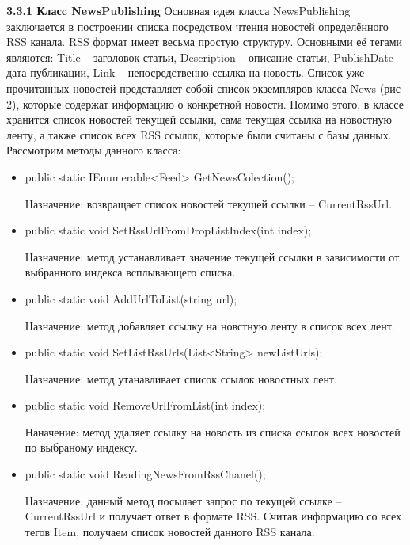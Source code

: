 \documentclass[14pt,a4paper]{extreport}
\begin{document}
	\flushleft{}
	\flushleft\hspace{4ex}\textbf{3.3.1 Класc NewsPublishing}
\flushleft\hspace{4ex}Основная идея класса NewsPublishing заключается в построении списка посредством чтения новостей определённого RSS канала. RSS формат имеет весьма простую структуру. Основными её тегами являются: Title – заголовок статьи, Description – описание статьи, PublishDate – дата публикации, Link – непосредственно ссылка на новость. Список уже прочитанных новостей представляет собой список экземпляров класса News (рис 2), которые содержат информацию о конкретной новости. Помимо этого, в классе хранится список новостей текущей ссылки, сама текущая ссылка на новостную ленту, а также список всех RSS ссылок, которые были считаны с базы данных. Рассмотрим методы данного класса:\par
\begin{itemize}
\item public static IEnumerable<Feed> GetNewsColection();\par
Назначение: возвращает список новостей текущей ссылки – CurrentRssUrl.\par
\item public static void SetRssUrlFromDropListIndex(int index);\par
Назначение: метод устанавливает значение текущей ссылки в зависимости от выбранного индекса всплывающего списка.\par
\item public static void AddUrlToList(string url);\par
Назначение: метод добавляет ссылку на новстную ленту в список всех лент.\par
\item public static void SetListRssUrls(List<String> newListUrls);\par
Назначение: метод утанавливает список ссылок новостных лент.\par
\item public static void RemoveUrlFromList(int index);\par
Наначение: метод удаляет ссылку на новость из списка ссылок всех новостей по выбраному индексу.\par
\item public static void ReadingNewsFromRssChanel();\par
Назначение: данный метод посылает запрос по текущей ссылке – CurrentRssUrl и получает ответ в формате RSS. Считав информацию со всех тегов Item, получаем список новостей данного RSS канала.\par
\end{itemize}
\end{document}
